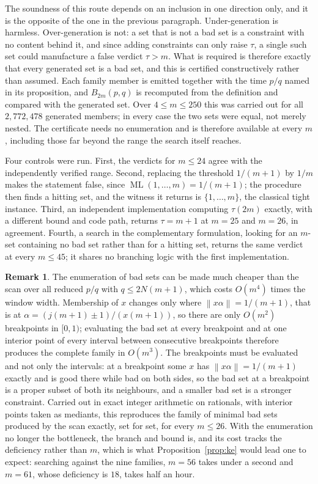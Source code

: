 \documentclass[11pt]{amsart}
\theoremstyle{plain}
\theoremstyle{definition}
\newtheorem{remark}[theorem]{Remark}
\newcommand{\Norm}[1]{\left\lVert #1 \right\rVert}
\newcommand{\ML}{\operatorname{ML}}
\begin{document}
The soundness of this route depends on an inclusion in one direction only, and it is the opposite of
the one in the previous paragraph. Under-generation is harmless. Over-generation is not: a set that
is not a bad set is a constraint with no content behind it, and since adding constraints can only
raise $\tau$, a single such set could manufacture a false verdict $\tau > m$. What is required is
therefore exactly that every generated set is a bad set, and this is certified constructively rather
than assumed. Each family member is emitted together with the time $p/q$ named in its proposition,
and $B_{2m}(p,q)$ is recomputed from the definition and compared with the generated set. Over
$4 \le m \le 250$ this was carried out for all $2{,}772{,}478$ generated members; in every case the
two sets were equal, not merely nested. The certificate needs no enumeration and is therefore
available at every $m$, including those far beyond the range the search itself reaches.

Four controls were run. First, the verdicts for $m \le 24$ agree with the independently verified
range. Second, replacing the threshold $1/(m+1)$ by $1/m$ makes the statement false, since
$\ML(1,\dots,m) = 1/(m+1)$; the procedure then finds a hitting set, and the witness it returns is
$\{1,\dots,m\}$, the classical tight instance. Third, an independent implementation computing
$\tau(2m)$ exactly, with a different bound and code path, returns $\tau = m+1$ at $m = 25$ and
$m = 26$, in agreement. Fourth, a search in the complementary formulation, looking for an $m$-set
containing no bad set rather than for a hitting set, returns the same verdict at every $m \le 45$;
it shares no branching logic with the first implementation.

\begin{remark}\label{rem:sweep}
The enumeration of bad sets can be made much cheaper than the scan over all reduced $p/q$ with
$q \le 2N(m+1)$, which costs $O(m^4)$ times the window width. Membership of $x$ changes only where
$\Norm{x\alpha} = 1/(m+1)$, that is at $\alpha = (j(m+1) \pm 1)/(x(m+1))$, so there are only $O(m^2)$
breakpoints in $[0,1)$; evaluating the bad set at every breakpoint and at one interior point of every
interval between consecutive breakpoints therefore produces the complete family in $O(m^3)$. The
breakpoints must be evaluated and not only the intervals: at a breakpoint some $x$ has
$\Norm{x\alpha} = 1/(m+1)$ exactly and is good there while bad on both sides, so the bad set at a
breakpoint is a proper subset of both its neighbours, and a smaller bad set is a stronger
constraint. Carried out in exact integer arithmetic on rationals, with interior points taken as
mediants, this reproduces the family of minimal bad sets produced by the scan exactly, set for set,
for every $m \le 26$. With the enumeration no longer the bottleneck, the branch and bound is, and its
cost tracks the deficiency rather than $m$, which is what Proposition~\ref{prop:ke} would lead one
to expect: searching against the nine families, $m = 56$ takes under a second and $m = 61$, whose
deficiency is $18$, takes half an hour.
\end{remark}
\end{document}
